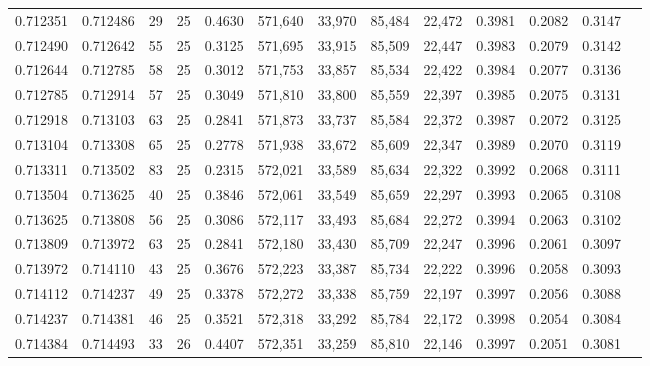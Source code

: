 \begin{tabular}{rrrrrrrrrrrrr}
0.712351 & 0.712486 &    29 &  25 &                                     0.4630 & 571,640 &  33,970 &  85,484 &  22,472 & 0.3981 & 0.2082 & 0.3147 \\
0.712490 & 0.712642 &    55 &  25 &                                     0.3125 & 571,695 &  33,915 &  85,509 &  22,447 & 0.3983 & 0.2079 & 0.3142 \\
0.712644 & 0.712785 &    58 &  25 &                                     0.3012 & 571,753 &  33,857 &  85,534 &  22,422 & 0.3984 & 0.2077 & 0.3136 \\
0.712785 & 0.712914 &    57 &  25 &                                     0.3049 & 571,810 &  33,800 &  85,559 &  22,397 & 0.3985 & 0.2075 & 0.3131 \\
0.712918 & 0.713103 &    63 &  25 &                                     0.2841 & 571,873 &  33,737 &  85,584 &  22,372 & 0.3987 & 0.2072 & 0.3125 \\
0.713104 & 0.713308 &    65 &  25 &                                     0.2778 & 571,938 &  33,672 &  85,609 &  22,347 & 0.3989 & 0.2070 & 0.3119 \\
0.713311 & 0.713502 &    83 &  25 &                                     0.2315 & 572,021 &  33,589 &  85,634 &  22,322 & 0.3992 & 0.2068 & 0.3111 \\
0.713504 & 0.713625 &    40 &  25 &                                     0.3846 & 572,061 &  33,549 &  85,659 &  22,297 & 0.3993 & 0.2065 & 0.3108 \\
0.713625 & 0.713808 &    56 &  25 &                                     0.3086 & 572,117 &  33,493 &  85,684 &  22,272 & 0.3994 & 0.2063 & 0.3102 \\
0.713809 & 0.713972 &    63 &  25 &                                     0.2841 & 572,180 &  33,430 &  85,709 &  22,247 & 0.3996 & 0.2061 & 0.3097 \\
0.713972 & 0.714110 &    43 &  25 &                                     0.3676 & 572,223 &  33,387 &  85,734 &  22,222 & 0.3996 & 0.2058 & 0.3093 \\
0.714112 & 0.714237 &    49 &  25 &                                     0.3378 & 572,272 &  33,338 &  85,759 &  22,197 & 0.3997 & 0.2056 & 0.3088 \\
0.714237 & 0.714381 &    46 &  25 &                                     0.3521 & 572,318 &  33,292 &  85,784 &  22,172 & 0.3998 & 0.2054 & 0.3084 \\
0.714384 & 0.714493 &    33 &  26 &                                     0.4407 & 572,351 &  33,259 &  85,810 &  22,146 & 0.3997 & 0.2051 & 0.3081 \\

\end{tabular}
